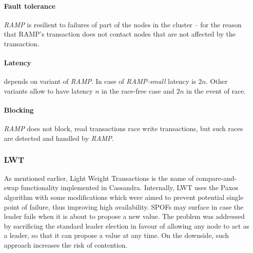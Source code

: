 \paragraph{Fault tolerance} \emph{RAMP} is resilient to failures of part of the nodes in the cluster -- for the reason that RAMP's transaction does not contact nodes that are not affected by the transaction. 

\paragraph{Latency} depends on variant of \emph{RAMP}. In case of \emph{RAMP-small} latency is $2n$. Other variants allow to have latency $n$ in the race-free case and $2n$ in the event of race.

\paragraph{Blocking} \emph{RAMP} does not block, read transactions race write transactions, but such races are detected and handled by \emph{RAMP}.




%

\subsubsection{LWT}\label{sec:theory:transactions:lwt}

As mentioned earlier, Light Weight Transactions is the name of compare-and-swap functionality implemented in Cassandra. Internally, LWT uses the Paxos algorithm with some modifications which were aimed to prevent potential single point of failure, thus improving high availability. SPOFs may surface in case the leader fails when it is about to propose a new value. The problem was addressed by sacrificing the standard leader election in favour of allowing any node to act as a leader, so that it can propose a value at any time. On the downside, such approach increases the risk of contention. 

